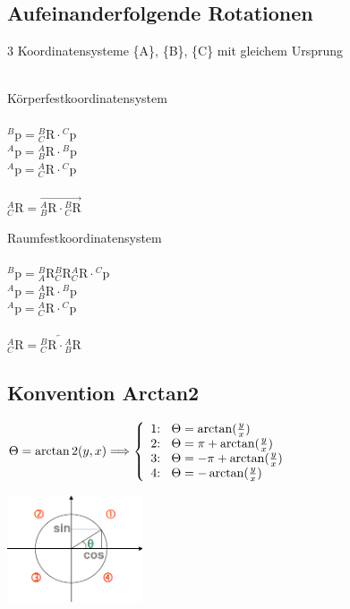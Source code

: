 \subsection{Aufeinanderfolgende Rotationen}
	3 Koordinatensysteme \{A\}, \{B\}, \{C\} mit gleichem Ursprung\\ \\
	\begin{minipage}{10cm}
		Körperfestkoordinatensystem\\ \\
		${}^B\mathrm{p}={}^B_C\mathrm{R}\cdot{}^C\mathrm{p}$\\
		${}^A\mathrm{p}={}^A_B\mathrm{R}\cdot{}^B\mathrm{p}$\\
		${}^A\mathrm{p}={}^A_C\mathrm{R}\cdot{}^C\mathrm{p}$\\ \\
		${}^A_C\mathrm{R}=\overrightarrow{{}^A_B\mathrm{R} \cdot {}^B_C\mathrm{R}}$\\
	\end{minipage}
	\begin{minipage}{10cm}
		Raumfestkoordinatensystem\\ \\
		${}^B\mathrm{p}={}^B_A\mathrm{R}{}^B_C\mathrm{R}{}^A_C\mathrm{R}\cdot{}^C\mathrm{p}$\\
		${}^A\mathrm{p}={}^A_B\mathrm{R}\cdot{}^B\mathrm{p}$\\
		${}^A\mathrm{p}={}^A_C\mathrm{R}\cdot{}^C\mathrm{p}$\\ \\
		${}^A_C\mathrm{R}=\overleftarrow{{}^B_C\mathrm{R} \cdot {}^A_B\mathrm{R}}$\\
	\end{minipage}

\subsection{Konvention Arctan2}
	\begin{minipage}{10cm}
    	$\Theta=\arctan2(y,x)\Longrightarrow\left\{
    	\begin{array}{l}
            \text{1:\space\space}\Theta=\arctan(\frac{y}{x})\\
			\text{2:\space\space}\Theta=\pi+\arctan(\frac{y}{x})\\
			\text{3:\space\space}\Theta=-\pi+\arctan(\frac{y}{x})\\
			\text{4:\space\space}\Theta=-\arctan(\frac{y}{x})\\
		\end{array}\right.$
    \end{minipage}
	\begin{minipage}{10cm}
    \includegraphics[width=4cm]{./bilder/einheitskreis.png}
    \end{minipage}






